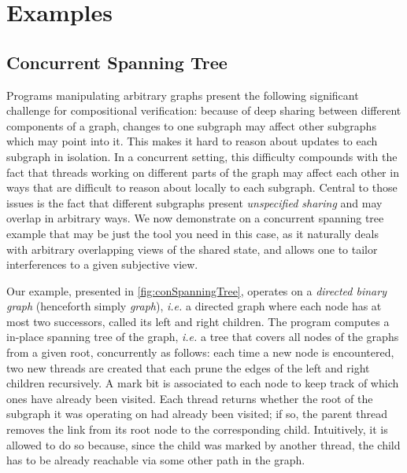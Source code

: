 \newpage
\chapter{Examples}\label{chapter:examples}



\section{Concurrent Spanning Tree}\label{sec:CST-example}
Programs manipulating arbitrary graphs present the following significant
challenge for compositional verification: because of deep sharing
between different components of a graph, changes to one subgraph may
affect other subgraphs which may point into it. This makes it hard to
reason about updates to each subgraph in isolation. In a concurrent
setting, this difficulty compounds with the fact that threads working
on different parts of the graph may affect each other in ways that are
difficult to reason about locally to each subgraph. Central to those
issues is the fact that different subgraphs present \emph{unspecified
  sharing} and may overlap in arbitrary ways. We now demonstrate on a
concurrent spanning tree example that \colosl may be just the tool you
need in this case, as it naturally deals with arbitrary overlapping
views of the shared state, and allows one to tailor interferences to a
given subjective view.

Our example, presented in \fig\ref{fig:conSpanningTree}, operates on a
\emph{directed binary graph} (henceforth simply \emph{graph}),
\textit{i.e.} a directed graph where each node has at most two
successors, called its left and right children. The program computes a
in-place spanning tree of the graph, \textit{i.e.} a tree that covers
all nodes of the graphs from a given root, concurrently as follows:
each time a new node is encountered, two new threads are created that
each prune the edges of the left and right children recursively. A
mark bit is associated to each node to keep track of which ones have
already been visited. Each thread returns whether the root
of the subgraph it was operating on had already been visited; if so,
the parent thread removes the link from its root node to the
corresponding child. Intuitively, it is allowed to do so because,
since the child was marked by another thread, the child has to be
already reachable via some other path in the graph.


